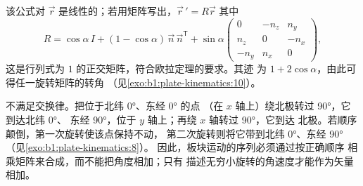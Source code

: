 该公式对 $\vec r$ 是线性的；若用矩阵写出，$\vec r\,' = R\vec r$
其中
\[
  R = \cos\alpha\,I + (1 - \cos\alpha)\,\vec n\,\vec n^{\mathsf T}
  + \sin\alpha
  \begin{pmatrix} 0 & -n_z & n_y\\ n_z & 0 & -n_x\\ -n_y & n_x & 0\end{pmatrix},
\]
这是行列式为 $1$ 的正交矩阵，符合欧拉定理的要求。其迹
为 $1 + 2\cos\alpha$，由此可得任一旋转矩阵的转角
（见\cref{exo:b1:plate-kinematics:10}）。

不满足交换律。把位于北纬 \ang{0}、东经 \ang{0} 的点
（在 $x$ 轴上）绕北极转过 \ang{90}，它到达北纬 \ang{0}、
东经 \ang{90}，位于 $y$ 轴上；再绕 $x$ 轴转过 \ang{90}，它到达
北极。若顺序颠倒，第一次旋转使该点保持不动，
第二次旋转则将它带到北纬 \ang{0}、东经 \ang{90}（见\cref{exo:b1:plate-kinematics:8}）。
因此，板块运动的序列必须通过按正确顺序
相乘矩阵来合成，而不能把角度相加；只有
描述无穷小旋转的角速度才能作为矢量相加。

